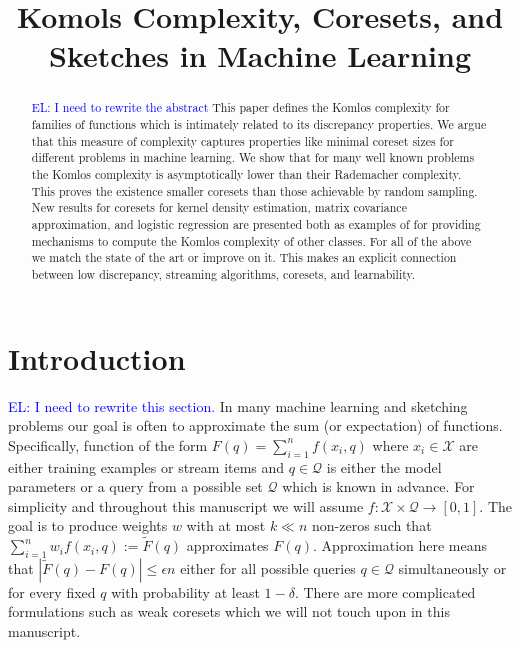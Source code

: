 \documentclass[anon,12pt]{colt2019} %
\title[Komols Complexity, Coresets, and Sketches in Machine Learning]{Komols Complexity, Coresets, and Sketches in Machine Learning}
\newcommand{\el}[1]{\textcolor{blue}{EL: #1}}
\newcommand{\eps}{\epsilon}
\newcommand{\X}{\mathcal{X}}
\newcommand{\Q}{\mathcal{Q}}
\begin{document}
\maketitle

\begin{abstract}
\el{I need to rewrite the abstract}
This paper defines the Komlos complexity for families of functions which is intimately related to its discrepancy properties.
We argue that this measure of complexity captures properties like minimal coreset sizes for different problems in machine learning. We show that for many well known problems the Komlos complexity is asymptotically lower than their Rademacher complexity. This proves the existence smaller coresets than those achievable by random sampling. 
New results for coresets for kernel density estimation, matrix covariance approximation, and logistic regression are presented both as examples of for providing mechanisms to compute the Komlos complexity of other classes.
For all of the above we match the state of the art or improve on it.
This makes an explicit connection between low discrepancy, streaming algorithms, coresets, and learnability. 
\end{abstract}


\section{Introduction}

\el{I need to rewrite this section.}
In many machine learning and sketching problems our goal is often to approximate the sum (or expectation) of functions.
Specifically, function of the form $F(q) = \sum_{i=1}^{n} f(x_i, q)$ where $x_i \in \mathcal X$ are either training examples or stream items and $q \in \mathcal Q$ is either the model parameters or a query from a possible set $\Q$ which is known in advance. For simplicity and throughout this manuscript we will assume $f:\X\times\Q\rightarrow [0,1]$.
The goal is to produce weights $w$ with at most $k \ll n$ non-zeros such that $\sum_{i=1}^{n}w_i f(x_i,q) := \tilde F(q)$ approximates $F(q)$.
Approximation here means that $|\tilde F(q)  - F(q)| \le \eps n$ either for all possible queries $q \in \mathcal Q$ simultaneously or for every fixed $q$ with probability at least $1-\delta$. 
There are more complicated formulations such as weak coresets which we will not touch upon in this manuscript.
\end{document}
